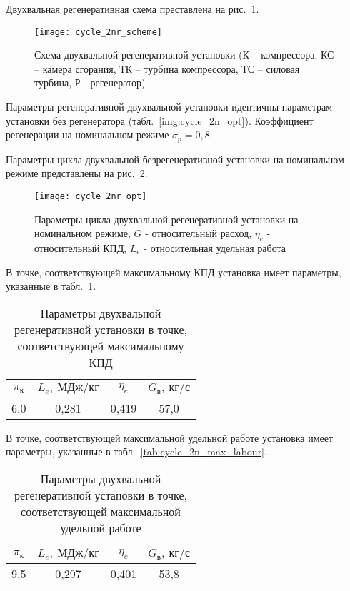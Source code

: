 Двухвальная регенеративная схема преставлена на рис.~\ref{img:cycle_2nr_scheme}.

\begin{figure}[H]
    \centering
    \texttt{[image: cycle\_2nr\_scheme]}
    \caption{Схема двухвальной регенеративной установки (К – компрессора, КС – камера сгорания, ТК – турбина компрессора, ТС – силовая турбина, Р - регенератор)}
    \label{img:cycle_2nr_scheme}
\end{figure}

Параметры регенеративной двухвальной установки идентичны параметрам установки без регенератора (табл.~\ref{img:cycle_2n_opt}). Коэффициент регенерации на номинальном режиме $\sigma_р = 0,8$.

Параметры цикла двухвальной безрегенеративной установки на номинальном режиме представлены на рис.~\ref{img:cycle_2nr_opt}.

\begin{figure}[H]
    \centering
    \texttt{[image: cycle\_2nr\_opt]}
    \caption{Параметры цикла двухвальной регенеративной установки на номинальном режиме,
	$\overline{G}$ - относительный расход, $\overline{\eta_e}$ - относительный КПД, $\overline{L_e}$ - относительная удельная работа}
    \label{img:cycle_2nr_opt}
\end{figure}

В точке, соответствующей максимальному КПД установка имеет параметры, указанные в табл.~\ref{tab:cycle_2nr_max_eta}.

\begin{longtable}{|c|c|c|c|}
	\caption{Параметры двухвальной регенеративной установки в точке, соответствующей максимальному КПД} 
	\label{tab:cycle_2nr_max_eta}
	\hline
	\textbf{$\pi_к$} & \textbf{$L_e, \ МДж/кг$} & \textbf{$\eta_e$} & \textbf{$G_в, \ кг/с$} \\ \hline
	6,0 & 0,281 & 0,419 & 57,0 \\ \hline
\end{longtable}


В точке, соответствующей максимальной удельной работе установка имеет параметры, указанные в табл.~\ref{tab:cycle_2n_max_labour}.
\begin{longtable}{|c|c|c|c|}
	\caption{Параметры двухвальной регенеративной установки в точке, соответствующей максимальной удельной работе} 
	\label{tab:cycle_2nr_max_labour}
	\hline
	\textbf{$\pi_к$} & \textbf{$L_e, \ МДж/кг$} & \textbf{$\eta_e$} & \textbf{$G_в, \ кг/с$} \\ \hline
	9,5 & 0,297 & 0,401 & 53,8 \\ \hline
\end{longtable}

